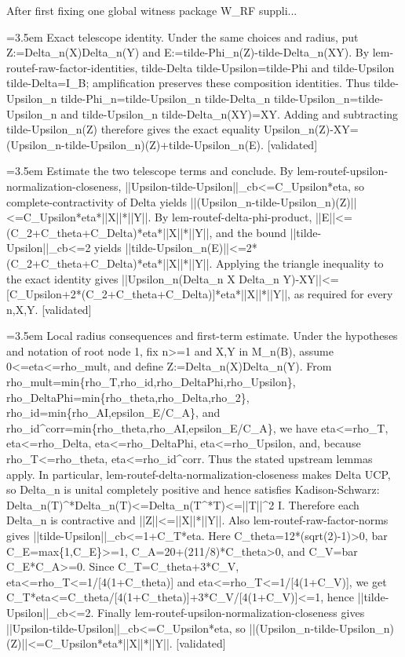 \documentclass{article}
\newcommand{\step}[1]{\par\noindent\hangindent=3.5em\hangafter=1%
  \makebox[3.5em][l]{\textbf{#1.}}}
\newcommand{\steptag}[1]{\hfill{\small\textsf{[#1]}}}
\begin{document}
\begin{proofbox}{After first fixing one global witness package W\_RF suppli...}
\step{1.2} Exact telescope identity. Under the same choices and radius, put Z:=Delta\_n(X)Delta\_n(Y) and E:=tilde-Phi\_n(Z)-tilde-Delta\_n(XY). By lem-routef-raw-factor-identities, tilde-Delta tilde-Upsilon=tilde-Phi and tilde-Upsilon tilde-Delta=I\_B; amplification preserves these composition identities. Thus tilde-Upsilon\_n tilde-Phi\_n=tilde-Upsilon\_n tilde-Delta\_n tilde-Upsilon\_n=tilde-Upsilon\_n and tilde-Upsilon\_n tilde-Delta\_n(XY)=XY. Adding and subtracting tilde-Upsilon\_n(Z) therefore gives the exact equality Upsilon\_n(Z)-XY=(Upsilon\_n-tilde-Upsilon\_n)(Z)+tilde-Upsilon\_n(E). \steptag{validated} \\[4pt]
\step{1.3} Estimate the two telescope terms and conclude. By lem-routef-upsilon-normalization-closeness, ||Upsilon-tilde-Upsilon||\_cb<=C\_Upsilon*eta, so complete-contractivity of Delta yields ||(Upsilon\_n-tilde-Upsilon\_n)(Z)||<=C\_Upsilon*eta*||X||*||Y||. By lem-routef-delta-phi-product, ||E||<=(C\_2+C\_theta+C\_Delta)*eta*||X||*||Y||, and the bound ||tilde-Upsilon||\_cb<=2 yields ||tilde-Upsilon\_n(E)||<=2*(C\_2+C\_theta+C\_Delta)*eta*||X||*||Y||. Applying the triangle inequality to the exact identity gives ||Upsilon\_n(Delta\_n X Delta\_n Y)-XY||<=[C\_Upsilon+2*(C\_2+C\_theta+C\_Delta)]*eta*||X||*||Y||, as required for every n,X,Y. \steptag{validated} \\[6pt]
\step{1.3.1} Local radius consequences and first-term estimate. Under the hypotheses and notation of root node 1, fix n>=1 and X,Y in M\_n(B), assume 0<=eta<=rho\_mult, and define Z:=Delta\_n(X)Delta\_n(Y). From rho\_mult=min\{rho\_T,rho\_id,rho\_DeltaPhi,rho\_Upsilon\}, rho\_DeltaPhi=min\{rho\_theta,rho\_Delta,rho\_2\}, rho\_id=min\{rho\_AI,epsilon\_E/C\_A\}, and rho\_id\textasciicircum{}corr=min\{rho\_theta,rho\_AI,epsilon\_E/C\_A\}, we have eta<=rho\_T, eta<=rho\_Delta, eta<=rho\_DeltaPhi, eta<=rho\_Upsilon, and, because rho\_T<=rho\_theta, eta<=rho\_id\textasciicircum{}corr. Thus the stated upstream lemmas apply. In particular, lem-routef-delta-normalization-closeness makes Delta UCP, so Delta\_n is unital completely positive and hence satisfies Kadison-Schwarz: Delta\_n(T)\textasciicircum{}*Delta\_n(T)<=Delta\_n(T\textasciicircum{}*T)<=||T||\textasciicircum{}2 I. Therefore each Delta\_n is contractive and ||Z||<=||X||*||Y||. Also lem-routef-raw-factor-norms gives ||tilde-Upsilon||\_cb<=1+C\_T*eta. Here C\_theta=12*(sqrt(2)-1)>0, bar C\_E=max\{1,C\_E\}>=1, C\_A=20+(211/8)*C\_theta>0, and C\_V=bar C\_E*C\_A>=0. Since C\_T=C\_theta+3*C\_V, eta<=rho\_T<=1/[4(1+C\_theta)] and eta<=rho\_T<=1/[4(1+C\_V)], we get C\_T*eta<=C\_theta/[4(1+C\_theta)]+3*C\_V/[4(1+C\_V)]<=1, hence ||tilde-Upsilon||\_cb<=2. Finally lem-routef-upsilon-normalization-closeness gives ||Upsilon-tilde-Upsilon||\_cb<=C\_Upsilon*eta, so ||(Upsilon\_n-tilde-Upsilon\_n)(Z)||<=C\_Upsilon*eta*||X||*||Y||. \steptag{validated} \\[4pt]

\end{proofbox}
\end{document}
